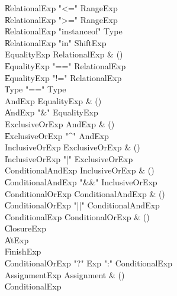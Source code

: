 \begin{bbgrammar}

    \| RelationalExp \xcd"<=" RangeExp\\
    \| RelationalExp \xcd">=" RangeExp\\
    \| RelationalExp \xcd"instanceof" Type\\
    \| RelationalExp \xcd"in" ShiftExp\\
 EqualityExp  \label{prod:EqualityExp}  \: RelationalExp & ()\\
    \| EqualityExp \xcd"==" RelationalExp\\
    \| EqualityExp \xcd"!=" RelationalExp\\
    \| Type  \xcd"==" Type \\
 AndExp  \label{prod:AndExp}  \: EqualityExp & ()\\
    \| AndExp \xcd"&" EqualityExp\\
 ExclusiveOrExp  \label{prod:ExclusiveOrExp}  \: AndExp & ()\\
    \| ExclusiveOrExp \xcd"^" AndExp\\
 InclusiveOrExp  \label{prod:InclusiveOrExp}  \: ExclusiveOrExp & ()\\
    \| InclusiveOrExp \xcd"|" ExclusiveOrExp\\
 ConditionalAndExp  \label{prod:ConditionalAndExp}  \: InclusiveOrExp & ()\\
    \| ConditionalAndExp \xcd"&&" InclusiveOrExp\\
 ConditionalOrExp  \label{prod:ConditionalOrExp}  \: ConditionalAndExp & ()\\
    \| ConditionalOrExp \xcd"||" ConditionalAndExp\\
 ConditionalExp  \label{prod:ConditionalExp}  \: ConditionalOrExp & ()\\
    \| ClosureExp\\
    \| AtExp\\
    \| FinishExp\\
    \| ConditionalOrExp \xcd"?" Exp \xcd":" ConditionalExp\\
 AssignmentExp  \label{prod:AssignmentExp}  \: Assignment & ()\\
    \| ConditionalExp\\

\end{bbgrammar}
